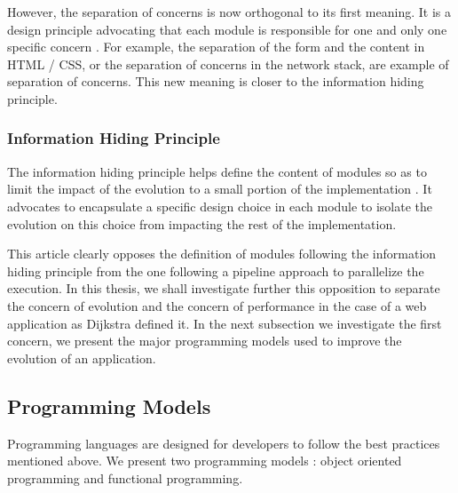 However, the separation of concerns is now orthogonal to its first meaning.
It is a design principle advocating that each module is responsible for one and only one specific concern \cite{Tarr1999,Hursch1995}.
For example, the separation of the form and the content in HTML / CSS, or the separation of concerns in the network stack, are example of separation of concerns.
This new meaning is closer to the information hiding principle.


\subsubsection{Information Hiding Principle}

The information hiding principle helps define the content of modules so as to limit the impact of the evolution to a small portion of the implementation \cite{Parnas1972}.
It advocates to encapsulate a specific design choice in each module to isolate the evolution on this choice from impacting the rest of the implementation.

This article clearly opposes the definition of modules following the information hiding principle from the one following a pipeline approach to parallelize the execution.
In this thesis, we shall investigate further this opposition to separate the concern of evolution and the concern of performance in the case of a web application as Dijkstra defined it.
In the next subsection we investigate the first concern, we present the major programming models used to improve the evolution of an application.


\subsection{Programming Models}

Programming languages are designed for developers to follow the best practices mentioned above.
We present two programming models : object oriented programming and functional programming.

